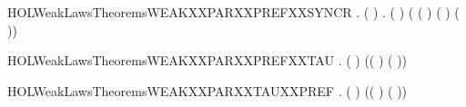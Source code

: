 \newcommand{\HOLWeakLawsTheoremsWEAKXXPARXXPREFXXNOXXSYNCR}{\UseVerbatim{HOLWeakLawsTheoremsWEAKXXPARXXPREFXXNOXXSYNCR}}
\begin{SaveVerbatim}{HOLWeakLawsTheoremsWEAKXXPARXXPREFXXSYNCR}
\HOLTokenTurnstile{} \HOLSymConst{\HOLTokenForall{}} .
       ( \HOLSymConst{=}  ) \HOLSymConst{\HOLTokenImp{}}
       \HOLSymConst{\HOLTokenForall{}} .
            (  \HOLSymConst{\ensuremath{\parallel}}  )
             ( ( \HOLSymConst{\ensuremath{\parallel}}  ) \HOLSymConst{+}
               (  \HOLSymConst{\ensuremath{\parallel}} ) \HOLSymConst{+} \HOLConst{\ensuremath{\tau}}( \HOLSymConst{\ensuremath{\parallel}} ))
\end{SaveVerbatim}
\newcommand{\HOLWeakLawsTheoremsWEAKXXPARXXPREFXXSYNCR}{\UseVerbatim{HOLWeakLawsTheoremsWEAKXXPARXXPREFXXSYNCR}}
\begin{SaveVerbatim}{HOLWeakLawsTheoremsWEAKXXPARXXPREFXXTAU}
\HOLTokenTurnstile{} \HOLSymConst{\HOLTokenForall{}}  .
        ( \HOLSymConst{\ensuremath{\parallel}} \HOLConst{\ensuremath{\tau}})
         (( \HOLSymConst{\ensuremath{\parallel}} \HOLConst{\ensuremath{\tau}}) \HOLSymConst{+} \HOLConst{\ensuremath{\tau}}( \HOLSymConst{\ensuremath{\parallel}} ))
\end{SaveVerbatim}
\newcommand{\HOLWeakLawsTheoremsWEAKXXPARXXPREFXXTAU}{\UseVerbatim{HOLWeakLawsTheoremsWEAKXXPARXXPREFXXTAU}}
\begin{SaveVerbatim}{HOLWeakLawsTheoremsWEAKXXPARXXTAUXXPREF}
\HOLTokenTurnstile{} \HOLSymConst{\HOLTokenForall{}}  .
        (\HOLConst{\ensuremath{\tau}} \HOLSymConst{\ensuremath{\parallel}} )
         (\HOLConst{\ensuremath{\tau}}( \HOLSymConst{\ensuremath{\parallel}} ) \HOLSymConst{+} (\HOLConst{\ensuremath{\tau}} \HOLSymConst{\ensuremath{\parallel}} ))
\end{SaveVerbatim}
